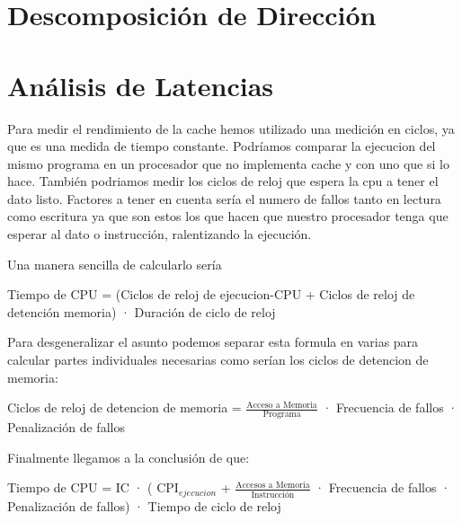 \documentclass{article}
\begin{document}
\section{Descomposición de Dirección}
\lipsum[4-6] %

\section{Análisis de Latencias}
Para medir el rendimiento de la cache hemos utilizado una medición en ciclos, ya que es una medida de tiempo constante. Podríamos comparar la ejecucion del mismo programa 
en un procesador que no implementa cache y con uno que si lo hace. También podriamos medir los ciclos de reloj que espera la cpu a tener el dato listo. Factores a tener en cuenta 
sería el numero de fallos tanto en lectura como escritura ya que son estos los que hacen que nuestro procesador tenga que esperar al dato o instrucción, ralentizando la ejecución.\par
Una manera sencilla de calcularlo sería\par

\begin{adjustwidth}{2cm}{2cm}
\vspace{15pt}
Tiempo de CPU = (Ciclos de reloj de ejecucion-CPU + Ciclos de reloj de detención memoria) · Duración de ciclo de reloj
\vspace{15pt}
\end{adjustwidth}

Para desgeneralizar el asunto podemos separar esta formula en varias para calcular partes individuales necesarias como serían los ciclos de detencion de memoria:

\begin{adjustwidth}{2cm}{2cm}
\vspace{15pt}
  Ciclos de reloj de detencion de memoria = $\frac{\text{Acceso a Memoria}}{\text{Programa}}$ · Frecuencia de fallos · Penalización de fallos
\vspace{15pt}
\end{adjustwidth}

Finalmente llegamos a la conclusión de que:

\begin{adjustwidth}{2cm}{2cm}
\vspace{15pt}
  Tiempo de CPU = IC · ( CPI$_{ejecucion}$ + $\frac{\text{Accesos a Memoria}}{\text{Instrucción}}$ · Frecuencia de fallos · Penalización de fallos) · Tiempo de ciclo de reloj
\vspace{15pt}
\end{adjustwidth}
\end{document}
